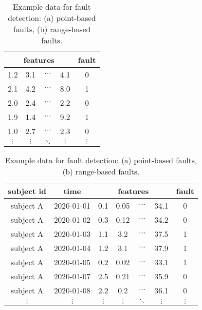 \begin{table}
	\centering
	\caption{Example data for fault detection: (a) point-based faults, (b) range-based faults.}
    \label{tab:approaches_fault_detection_data}
    \label{tab:approaches_fault_detection_data_point}
    \begin{tabular}{|cccc|c|}
    \hline 
        \multicolumn{4}{|p{5cm}|}{\centering features}
        & \multicolumn{1}{|p{2.1cm}|}{\centering fault}\\\hline
        1.2  &           3.1 & $\cdots$ &      4.1 &        0 \\
        2.1  &           4.2 & $\cdots$ &      8.0 &        1 \\
    	2.0  &           2.4 & $\cdots$ &      2.2 &        0 \\
    	1.9  &           1.4 & $\cdots$ &      9.2 &        1 \\
    	1.0  &           2.7 & $\cdots$ &      2.3 &        0 \\
        $\vdots$ &      $\vdots$ & $\ddots$ & $\vdots$ & $\vdots$ \\
    \end{tabular}
    \bigskip
    \label{tab:approaches_fault_detection_data_range}
	\begin{tabular}{|c|c|cccc|c|}
    \hline
    subject id
    & time
    & \multicolumn{4}{|p{4cm}|}{\centering features}
    & fault\\
    \hline
    subject A & 2020-01-01 &          0.1 &         0.05 & $\cdots$ &  34.1 & 0 \\
	subject A & 2020-01-02 &          0.3 &         0.12 & $\cdots$ &  34.2 & 0 \\
    subject A & 2020-01-03 &          1.1 &         3.2  & $\cdots$ &  37.5 & 1 \\
    subject A & 2020-01-04 &          1.2 &         3.1  & $\cdots$ &  37.9 & 1 \\
    subject A & 2020-01-05 &          0.2 &         0.02 & $\cdots$ &  33.1 & 1 \\
    subject A & 2020-01-07 &          2.5 &         0.21 & $\cdots$ &  35.9 & 0 \\
    subject A & 2020-01-08 &          2.2 &         0.2  & $\cdots$ &  36.1 & 0 \\
    $\vdots$ & $\vdots$ & $\vdots$ & $\vdots$ & $\ddots$ & $\vdots$ & $\vdots$ \\
	\end{tabular}
\end{table}

